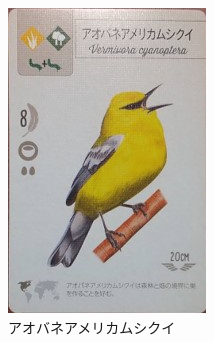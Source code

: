\begin{figure}[h]
\centering
\begin{minipage}[b]{0.23\columnwidth}
    \centering
    \includegraphics[width=0.9\columnwidth]{2025shinki/wing_span/aobaneamerikamusikui.jpg}
    \caption{アオバネアメリカムシクイ}
    \label{fig:アオバネアメリカムシクイ}
\end{minipage}
\begin{minipage}[b]{0.23\columnwidth}
    \centering

\end{minipage}
\end{figure}
